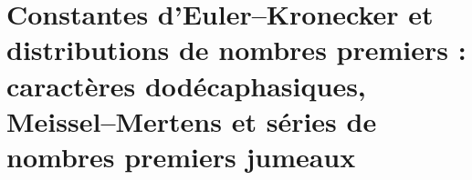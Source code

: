 \chapter{Constantes d’Euler--Kronecker et distributions de nombres premiers : caractères dodécaphasiques, Meissel--Mertens et séries de nombres premiers jumeaux}
\label{chap:p3-final:42:euler_kronecker_primos}

